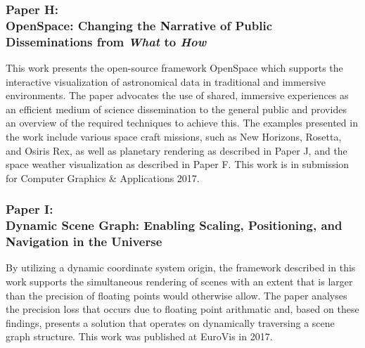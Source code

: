 
 \subsubsection{Paper H:\\OpenSpace: Changing the Narrative of Public Disseminations from \emph{What} to \emph{How}}
 This work presents the open-source framework OpenSpace which supports the interactive visualization of astronomical data in traditional and immersive environments.  The paper advocates the use of shared, immersive experiences as an efficient medium of science dissemination to the general public and provides an overview of the required techniques to achieve this.  The examples presented in the work include various space craft missions, such as New Horizons, Rosetta, and Osiris Rex, as well as planetary rendering as described in Paper J, and the space weather visualization as described in Paper F.  This work is in submission for Computer Graphics \& Applications 2017.

\subsubsection{Paper I:\\Dynamic Scene Graph: Enabling Scaling, Positioning, and Navigation in the Universe}
By utilizing a dynamic coordinate system origin, the framework described in this work supports the simultaneous rendering of scenes with an extent that is larger than the precision of floating points would otherwise allow.  The paper analyses the precision loss that occurs due to floating point arithmatic and, based on these findings, presents a solution that operates on dynamically traversing a scene graph structure.  This work was published at EuroVis in 2017.

